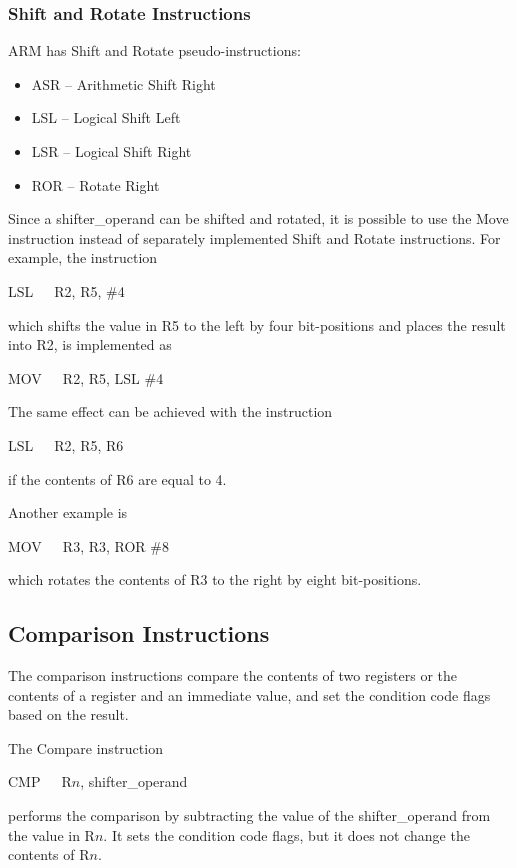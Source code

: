 \documentclass[11pt, twoside, pdftex]{article}
\begin{document}
\subsubsection{Shift and Rotate Instructions}

ARM has Shift and Rotate pseudo-instructions:
\begin{itemize}
\item ASR -- Arithmetic Shift Right
\item LSL -- Logical Shift Left
\item LSR -- Logical Shift Right
\item ROR -- Rotate Right
\end{itemize}
\noindent

Since a shifter\_operand can be shifted and rotated, it is
possible to use the Move instruction instead of separately
implemented Shift and Rotate instructions. 
For example, the instruction
\begin{center}
LSL~~~R2, R5, \#4
\end{center}
\noindent
which shifts the value in R5 to the left by four bit-positions  
and places the result into R2, is implemented as
\begin{center}
MOV~~~R2, R5, LSL \#4
\end{center}
\noindent
The same effect can be achieved with the instruction
\begin{center}
LSL~~~R2, R5, R6
\end{center}
\noindent
if the contents of R6 are equal to 4.

Another example is 
\begin{center}
MOV~~~R3, R3, ROR \#8
\end{center}
\noindent
which rotates the contents of R3 to the right by eight
bit-positions.   


\subsection{Comparison Instructions}

The comparison instructions compare the contents of two registers
or the contents of a register and an immediate value, and set the 
condition code flags based on the result.

The Compare instruction
\begin{center}
CMP~~~R$n$, shifter\_operand
\end{center}
\noindent 
performs the comparison by subtracting the value of the
shifter\_operand from the value in R$n$. It sets the condition
code flags, but it does not change the contents of R$n$.
\end{document}
